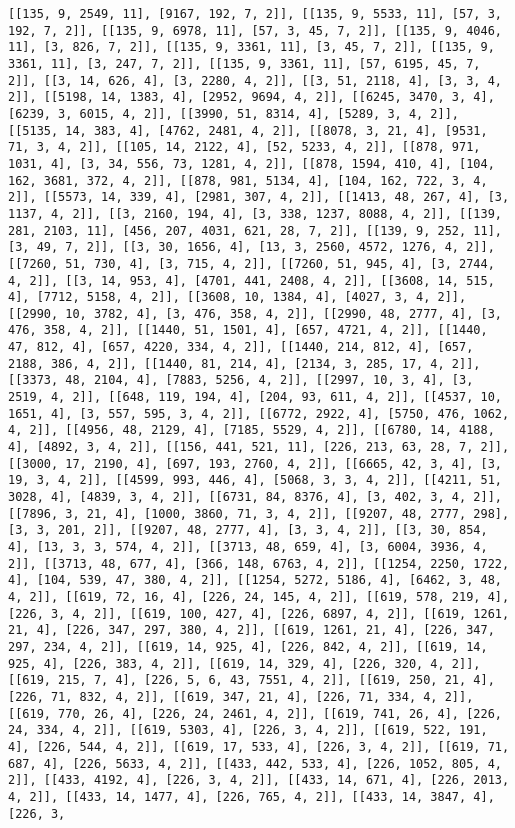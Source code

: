 \documentclass[12pt,fleqn]{article}\usepackage{../../common}
\begin{document}
\begin{verbatim}
[[135, 9, 2549, 11], [9167, 192, 7, 2]], [[135, 9, 5533, 11], [57, 3, 192, 7, 2]], [[135, 9, 6978, 11], [57, 3, 45, 7, 2]], [[135, 9, 4046, 11], [3, 826, 7, 2]], [[135, 9, 3361, 11], [3, 45, 7, 2]], [[135, 9, 3361, 11], [3, 247, 7, 2]], [[135, 9, 3361, 11], [57, 6195, 45, 7, 2]], [[3, 14, 626, 4], [3, 2280, 4, 2]], [[3, 51, 2118, 4], [3, 3, 4, 2]], [[5198, 14, 1383, 4], [2952, 9694, 4, 2]], [[6245, 3470, 3, 4], [6239, 3, 6015, 4, 2]], [[3990, 51, 8314, 4], [5289, 3, 4, 2]], [[5135, 14, 383, 4], [4762, 2481, 4, 2]], [[8078, 3, 21, 4], [9531, 71, 3, 4, 2]], [[105, 14, 2122, 4], [52, 5233, 4, 2]], [[878, 971, 1031, 4], [3, 34, 556, 73, 1281, 4, 2]], [[878, 1594, 410, 4], [104, 162, 3681, 372, 4, 2]], [[878, 981, 5134, 4], [104, 162, 722, 3, 4, 2]], [[5573, 14, 339, 4], [2981, 307, 4, 2]], [[1413, 48, 267, 4], [3, 1137, 4, 2]], [[3, 2160, 194, 4], [3, 338, 1237, 8088, 4, 2]], [[139, 281, 2103, 11], [456, 207, 4031, 621, 28, 7, 2]], [[139, 9, 252, 11], [3, 49, 7, 2]], [[3, 30, 1656, 4], [13, 3, 2560, 4572, 1276, 4, 2]], [[7260, 51, 730, 4], [3, 715, 4, 2]], [[7260, 51, 945, 4], [3, 2744, 4, 2]], [[3, 14, 953, 4], [4701, 441, 2408, 4, 2]], [[3608, 14, 515, 4], [7712, 5158, 4, 2]], [[3608, 10, 1384, 4], [4027, 3, 4, 2]], [[2990, 10, 3782, 4], [3, 476, 358, 4, 2]], [[2990, 48, 2777, 4], [3, 476, 358, 4, 2]], [[1440, 51, 1501, 4], [657, 4721, 4, 2]], [[1440, 47, 812, 4], [657, 4220, 334, 4, 2]], [[1440, 214, 812, 4], [657, 2188, 386, 4, 2]], [[1440, 81, 214, 4], [2134, 3, 285, 17, 4, 2]], [[3373, 48, 2104, 4], [7883, 5256, 4, 2]], [[2997, 10, 3, 4], [3, 2519, 4, 2]], [[648, 119, 194, 4], [204, 93, 611, 4, 2]], [[4537, 10, 1651, 4], [3, 557, 595, 3, 4, 2]], [[6772, 2922, 4], [5750, 476, 1062, 4, 2]], [[4956, 48, 2129, 4], [7185, 5529, 4, 2]], [[6780, 14, 4188, 4], [4892, 3, 4, 2]], [[156, 441, 521, 11], [226, 213, 63, 28, 7, 2]], [[3000, 17, 2190, 4], [697, 193, 2760, 4, 2]], [[6665, 42, 3, 4], [3, 19, 3, 4, 2]], [[4599, 993, 446, 4], [5068, 3, 3, 4, 2]], [[4211, 51, 3028, 4], [4839, 3, 4, 2]], [[6731, 84, 8376, 4], [3, 402, 3, 4, 2]], [[7896, 3, 21, 4], [1000, 3860, 71, 3, 4, 2]], [[9207, 48, 2777, 298], [3, 3, 201, 2]], [[9207, 48, 2777, 4], [3, 3, 4, 2]], [[3, 30, 854, 4], [13, 3, 3, 574, 4, 2]], [[3713, 48, 659, 4], [3, 6004, 3936, 4, 2]], [[3713, 48, 677, 4], [366, 148, 6763, 4, 2]], [[1254, 2250, 1722, 4], [104, 539, 47, 380, 4, 2]], [[1254, 5272, 5186, 4], [6462, 3, 48, 4, 2]], [[619, 72, 16, 4], [226, 24, 145, 4, 2]], [[619, 578, 219, 4], [226, 3, 4, 2]], [[619, 100, 427, 4], [226, 6897, 4, 2]], [[619, 1261, 21, 4], [226, 347, 297, 380, 4, 2]], [[619, 1261, 21, 4], [226, 347, 297, 234, 4, 2]], [[619, 14, 925, 4], [226, 842, 4, 2]], [[619, 14, 925, 4], [226, 383, 4, 2]], [[619, 14, 329, 4], [226, 320, 4, 2]], [[619, 215, 7, 4], [226, 5, 6, 43, 7551, 4, 2]], [[619, 250, 21, 4], [226, 71, 832, 4, 2]], [[619, 347, 21, 4], [226, 71, 334, 4, 2]], [[619, 770, 26, 4], [226, 24, 2461, 4, 2]], [[619, 741, 26, 4], [226, 24, 334, 4, 2]], [[619, 5303, 4], [226, 3, 4, 2]], [[619, 522, 191, 4], [226, 544, 4, 2]], [[619, 17, 533, 4], [226, 3, 4, 2]], [[619, 71, 687, 4], [226, 5633, 4, 2]], [[433, 442, 533, 4], [226, 1052, 805, 4, 2]], [[433, 4192, 4], [226, 3, 4, 2]], [[433, 14, 671, 4], [226, 2013, 4, 2]], [[433, 14, 1477, 4], [226, 765, 4, 2]], [[433, 14, 3847, 4], [226, 3, 
\end{verbatim}
\end{document}

